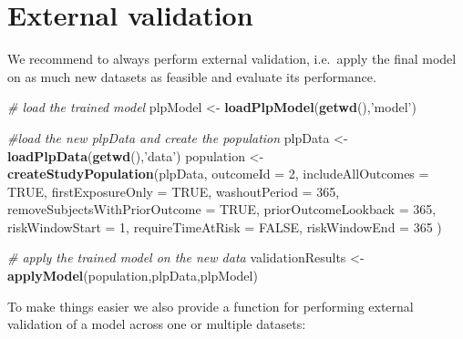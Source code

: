 \documentclass[]{book}
\newenvironment{Shaded}{\begin{snugshade}}{\end{snugshade}}
\newcommand{\KeywordTok}[1]{\textcolor[rgb]{0.13,0.29,0.53}{\textbf{#1}}}
\newcommand{\DataTypeTok}[1]{\textcolor[rgb]{0.13,0.29,0.53}{#1}}
\newcommand{\DecValTok}[1]{\textcolor[rgb]{0.00,0.00,0.81}{#1}}
\newcommand{\StringTok}[1]{\textcolor[rgb]{0.31,0.60,0.02}{#1}}
\newcommand{\CommentTok}[1]{\textcolor[rgb]{0.56,0.35,0.01}{\textit{#1}}}
\newcommand{\OtherTok}[1]{\textcolor[rgb]{0.56,0.35,0.01}{#1}}
\newcommand{\NormalTok}[1]{#1}
\begin{document}
\newpage

\section{External validation}\label{external-validation}

We recommend to always perform external validation, i.e.~apply the final
model on as much new datasets as feasible and evaluate its performance.

\begin{Shaded}
\begin{Highlighting}[]
\CommentTok{# load the trained model}
\NormalTok{plpModel <-}\StringTok{ }\KeywordTok{loadPlpModel}\NormalTok{(}\KeywordTok{getwd}\NormalTok{(),}\StringTok{'model'}\NormalTok{)}

\CommentTok{#load the new plpData and create the population}
\NormalTok{plpData <-}\StringTok{ }\KeywordTok{loadPlpData}\NormalTok{(}\KeywordTok{getwd}\NormalTok{(),}\StringTok{'data'}\NormalTok{)}
\NormalTok{population <-}\StringTok{ }\KeywordTok{createStudyPopulation}\NormalTok{(plpData,}
\DataTypeTok{outcomeId =} \DecValTok{2}\NormalTok{,}
\DataTypeTok{includeAllOutcomes =} \OtherTok{TRUE}\NormalTok{,}
\DataTypeTok{firstExposureOnly =} \OtherTok{TRUE}\NormalTok{,}
\DataTypeTok{washoutPeriod =} \DecValTok{365}\NormalTok{,}
\DataTypeTok{removeSubjectsWithPriorOutcome =} \OtherTok{TRUE}\NormalTok{,}
\DataTypeTok{priorOutcomeLookback =} \DecValTok{365}\NormalTok{,}
\DataTypeTok{riskWindowStart =} \DecValTok{1}\NormalTok{,}
\DataTypeTok{requireTimeAtRisk =} \OtherTok{FALSE}\NormalTok{,}
\DataTypeTok{riskWindowEnd =} \DecValTok{365}
\NormalTok{)}

\CommentTok{# apply the trained model on the new data}
\NormalTok{validationResults <-}\StringTok{ }\KeywordTok{applyModel}\NormalTok{(population,plpData,plpModel)}
\end{Highlighting}
\end{Shaded}

To make things easier we also provide a function for performing external
validation of a model across one or multiple datasets:
\end{document}
